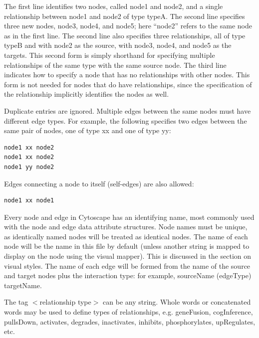  The first line identifies two nodes, called node1 and node2, and a single relationship between node1 and node2 of type typeA. The second line specifies three new nodes, node3, node4, and node5; here ``node2'' refers to the same node as in the first line. The second line also specifies three relationships, all of type typeB and with node2 as the source, with node3, node4, and node5 as the targets. This second form is simply shorthand for specifying multiple relationships of the same type with the same source node. The third line indicates how to specify a node that has no relationships with other nodes. This form is not needed for nodes that do have relationships, since the specification of the relationship implicitly identifies the nodes as well. 


 Duplicate entries are ignored. Multiple edges between the same nodes must have different edge types. For example, the following specifies two edges between the same pair of nodes, one of type xx and one of type yy: 


 \begin{verbatim}
node1 xx node2
node1 xx node2
node1 yy node2

\end{verbatim}



 Edges connecting a node to itself (self-edges) are also allowed: 


 \begin{verbatim}
node1 xx node1

\end{verbatim}



 Every node and edge in Cytoscape has an identifying name, most commonly used with the node and edge data attribute structures. Node names must be unique, as identically named nodes will be treated as identical nodes. The name of each node will be the name in this file by default (unless another string is mapped to display on the node using the visual mapper). This is discussed in the section on visual styles. The name of each edge will be formed from the name of the source and target nodes plus the interaction type: for example, sourceName (edgeType) targetName. 


 The tag $<$relationship type$>$ can be any string. Whole words or concatenated words may be used to define types of relationships, e.g. geneFusion, cogInference, pullsDown, activates, degrades, inactivates, inhibits, phosphorylates, upRegulates, etc. 



